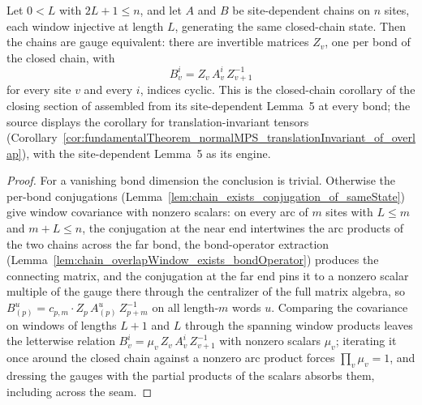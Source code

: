 \begin{corollary}%
    \label{cor:fundamentalTheorem_normalMPSChain_of_overlap}
    \leanok
    Let $0 < L$ with $2L + 1 \le n$, and let $A$ and $B$ be
    site-dependent chains on $n$ sites, each window injective at length
    $L$, generating the same closed-chain state.  Then the chains are
    gauge equivalent: there are invertible matrices $Z_v$, one per bond
    of the closed chain, with
    \[
        B_v^i = Z_v\, A_v^i\, Z_{v+1}^{-1}
    \]
    for every site $v$ and every $i$, indices cyclic.  This is the
    closed-chain corollary of the closing section of
    \cite{Molnar2018NormalPEPS} assembled from its site-dependent
    Lemma~5 at every bond; the source displays the corollary for
    translation-invariant tensors
    (Corollary~\ref{cor:fundamentalTheorem_normalMPS_translationInvariant_of_overlap}),
    with the site-dependent Lemma~5 as its engine.
\end{corollary}
\begin{proof}\leanok
    For a vanishing bond dimension the conclusion is trivial.  Otherwise
    the per-bond conjugations
    (Lemma~\ref{lem:chain_exists_conjugation_of_sameState}) give window
    covariance with nonzero scalars: on every arc of $m$ sites with
    $L \le m$ and $m + L \le n$, the conjugation at the near end
    intertwines the arc products of the two chains across the far bond,
    the bond-operator extraction
    (Lemma~\ref{lem:chain_overlapWindow_exists_bondOperator}) produces
    the connecting matrix, and the conjugation at the far end pins it to
    a nonzero scalar multiple of the gauge there through the centralizer
    of the full matrix algebra, so
    $B_{(p)}^{u} = c_{p,m} \cdot Z_p\, A_{(p)}^{u}\, Z_{p+m}^{-1}$ on all
    length-$m$ words $u$.  Comparing the covariance on windows of lengths
    $L + 1$ and $L$ through the spanning window products leaves the
    letterwise relation $B_v^i = \mu_v\, Z_v\, A_v^i\, Z_{v+1}^{-1}$ with
    nonzero scalars $\mu_v$; iterating it once around the closed chain
    against a nonzero arc product forces $\prod_v \mu_v = 1$, and
    dressing the gauges with the partial products of the scalars absorbs
    them, including across the seam.
\end{proof}


